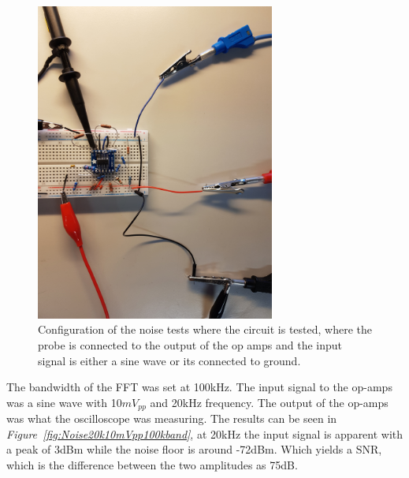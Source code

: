 
\begin{figure}[h]
    \centering
    \includegraphics[width=0.7\textwidth]{graphics/TESTINGwSineinp.jpg}
    \caption{Configuration of the noise tests where the circuit is tested, where the probe is connected to the output of the op amps and the input signal is either a sine wave or its connected to ground.}
    \label{fig:SetupFFT}
\end{figure}


The bandwidth of the FFT was set at 100kHz.
The input signal to the op-amps was a sine wave with 10$mV_{pp}$ and 20kHz frequency.
The output of the op-amps was what the oscilloscope was measuring.
The results can be seen in \textit{Figure~\ref{fig:Noise20k10mVpp100kband}}, at 20kHz the input signal is apparent with a peak of 3dBm while the noise floor is around -72dBm.
Which yields a SNR, which is the difference between the two amplitudes as 75dB.

\clearpage


